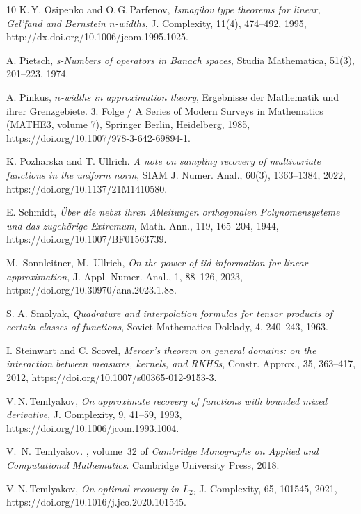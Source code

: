 \documentclass[a4paper,12pt]{amsart}
\theoremstyle{definition}
\theoremstyle{remark}
\begin{document}
{\begin{thebibliography}{10}
K.\,Y. Osipenko and  O.\,G.\,Parfenov, 
{\it Ismagilov type theorems for linear, {G}el'fand and {B}ernstein
          {$n$}-widths},
 {J. Complexity},
 {11(4)}, {474--492},
 {1995},
http://dx.doi.org/10.1006/jcom.1995.1025.


A. Pietsch, {\it s-Numbers of operators in Banach spaces}, 
Studia Mathematica, 51(3), 201--223, 1974.


A. Pinkus, {\it $n$-widths in approximation theory}, 
Ergebnisse der Mathematik und ihrer Grenzgebiete. 3. Folge / A Series of Modern Surveys in Mathematics (MATHE3, volume 7), Springer Berlin, Heidelberg, 1985, 
https://doi.org/10.1007/978-3-642-69894-1.


K. Pozharska and T. Ullrich.
{\it A note on sampling recovery of multivariate functions in the uniform norm}, 
SIAM J. Numer. Anal., 60(3),  1363--1384, 2022, https://doi.org/10.1137/21M1410580. 




 E. Schmidt, 
{\it \"Uber die nebst ihren Ableitungen orthogonalen Polynomensysteme und das zugeh\"orige Extremum},
Math. Ann., 119, 165--204, 1944, https://doi.org/10.1007/BF01563739.


M.~Sonnleitner, M.~Ullrich, 
{\it On the power of iid information for linear approximation}, 
J. Appl. Numer. Anal., 
 1,  88--126, 2023, 
https://doi.org/10.30970/ana.2023.1.88.

S. A. Smolyak,       
{\it Quadrature and interpolation formulas for tensor products       
of certain classes of functions},     
Soviet Mathematics Doklady, 4, 240--243, 1963. 


I. Steinwart and C. Scovel,
{\it Mercer’s theorem on general domains:
on the interaction between measures, kernels,
and {RKHS}s},
Constr. Approx., 35, 363--417, 2012, 
https://doi.org/10.1007/s00365-012-9153-3.

V.\,N.\,Temlyakov, 
{\it On approximate recovery of functions with bounded mixed derivative}, J.
 Complexity, 9,  41--59, 1993, https://doi.org/10.1006/jcom.1993.1004. 


V.~N. Temlyakov.
, volume~32 of {\em Cambridge
  Monographs on Applied and Computational Mathematics}.
\newblock Cambridge University Press, 2018.

 V.\,N.\,Temlyakov, {\it On optimal recovery in $L_2$},  
J. Complexity, 65, 101545, 2021, https://doi.org/10.1016/j.jco.2020.101545.




\end{thebibliography}}
\end{document}

